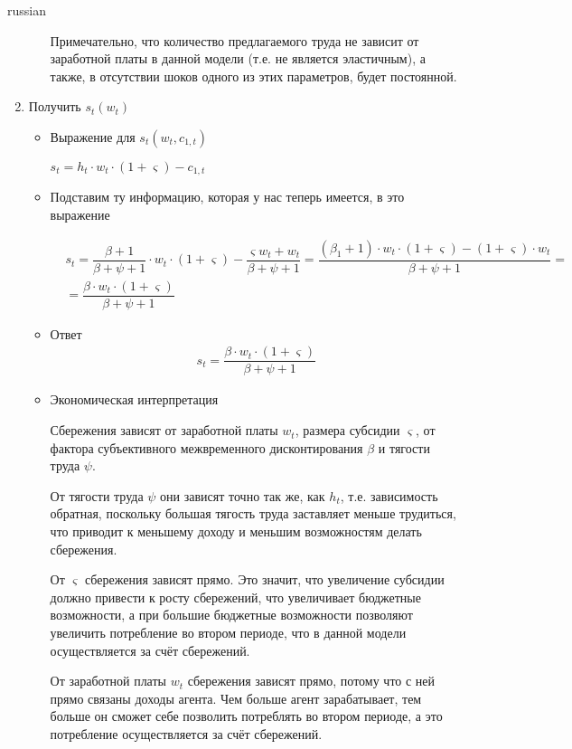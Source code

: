 \documentclass[fleqn]{article}
\begin{document}
\begin{otherlanguage*}{russian}
\begin{enumerate}[label=\alph*), leftmargin=*]
\begin{itemize}
Примечательно, что количество предлагаемого труда не зависит от заработной платы в данной модели (т.е. не является эластичным), а также, в отсутствии шоков одного из этих параметров, будет постоянной.
\end{itemize}
\item Получить $ s_t (w_t ) $ 
\begin{itemize}
\item Выражение для $ s_t(w_t, c_{1, t})$ 

$ s_t = h_t \cdot w_t \cdot (1 + \varsigma) - c_{1, t} $ 
\item Подставим ту информацию, которая у нас теперь имеется, в это выражение

\begin{align*}
&s_t = \dfrac{\beta + 1}{\beta + \psi + 1} \cdot w_t \cdot (1 + \varsigma) - \dfrac{\varsigma w_t  + w_t}{\beta + \psi + 1 } = \dfrac{(\beta_1 + 1) \cdot w_t \cdot (1 + \varsigma) - (1 + \varsigma) \cdot w_t}{\beta + \psi + 1 } = \\
&= \dfrac{\beta \cdot  w_t \cdot (1 + \varsigma)}{\beta + \psi + 1 } 
\end{align*}
\item Ответ
\begin{align*}
s_t = \dfrac{\beta \cdot w_t \cdot (1 + \varsigma)}{\beta + \psi + 1}
\end{align*}
\item Экономическая интерпретация 

Сбережения зависят от заработной платы $ w_t$, размера субсидии $ \varsigma$, от фактора субъективного межвременного дисконтирования  $ \beta $ и тягости труда $ \psi $. 

От тягости труда $ \psi $ они зависят точно так же, как $ h_t$, т.е. зависимость обратная, поскольку большая тягость труда заставляет меньше трудиться, что приводит к меньшему доходу и меньшим возможностям делать сбережения.

От $ \varsigma $ сбережения зависят прямо. Это значит, что увеличение субсидии должно привести к росту сбережений, что увеличивает бюджетные возможности, а при большие бюджетные возможности позволяют увеличить потребление во втором периоде, что в данной модели осуществляется за счёт сбережений. 

От заработной платы $ w_t $ сбережения зависят прямо, потому что с ней прямо связаны доходы агента. Чем больше агент зарабатывает, тем больше он сможет себе позволить потреблять во втором периоде, а это потребление осуществляется за счёт сбережений. 


\end{itemize}
\end{enumerate}
\end{otherlanguage*}
\end{document}
